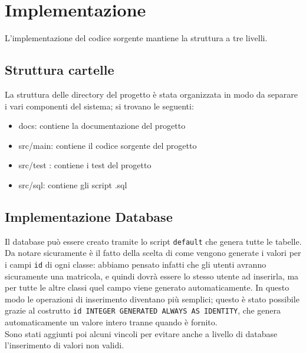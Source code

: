 \section{Implementazione}

L'implementazione del codice sorgente mantiene la struttura a tre livelli.
\subsection{Struttura cartelle}
La struttura delle directory del progetto è stata organizzata in modo da separare i vari componenti del sistema; si trovano le seguenti:
\begin{itemize}
    \item docs: contiene la documentazione del progetto
    \item src/main: contiene il codice sorgente del progetto
    \item src/test : contiene i test del progetto
    \item src/sql: contiene gli script .sql
\end{itemize}

\subsection{Implementazione Database}\label{subsec:DBimpl}
Il database può essere creato tramite lo script \texttt{default} che genera tutte le tabelle.
Da notare sicuramente è il fatto della scelta di come vengono generate i valori per i campi \texttt{id} di ogni classe: abbiamo pensato infatti che gli utenti avranno sicuramente una matricola, e quindi dovrà essere lo stesso utente ad inserirla, ma per tutte le altre classi quel campo viene generato automaticamente. In questo modo le operazioni di inserimento diventano più semplici; questo è stato possibile grazie al costrutto \texttt{id INTEGER GENERATED ALWAYS AS IDENTITY}, che genera automaticamente un valore intero tranne quando è fornito.\\
Sono stati aggiunti poi alcuni vincoli per evitare anche a livello di database l'inserimento di valori non validi.

